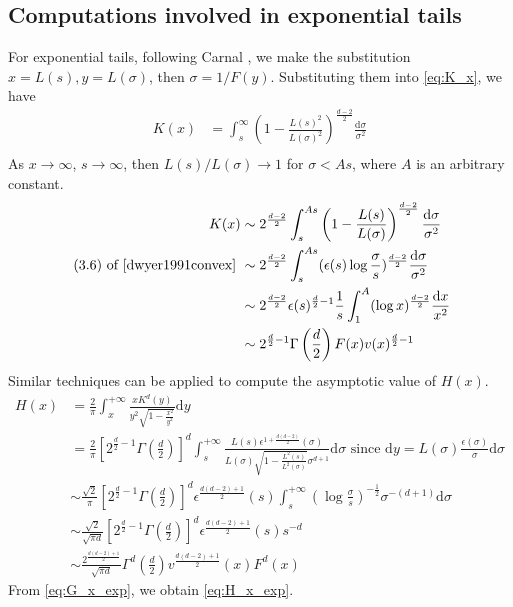 \documentclass{aptpub}
\def\d{\mathrm{d}}
\begin{document}
\subsection{Computations involved in exponential tails}
For exponential tails, following Carnal \cite{carnal1970konvexe},
we make
the substitution $x=L(s), y=L(\sigma)$, then $\sigma=1/F(y)$.
Substituting them into \eqref{eq:K_x}, we have
\begin{align*}
    K(x)  & = \int_s^{\infty} \left(1-\frac{L(s)^2}{L(\sigma)^2} \right)^{\frac{d-2}{2}} \frac{\d \sigma}{\sigma^2} \\
\end{align*}
As $x\to \infty$, $s\to \infty$,
then $L(s)/L(\sigma) \to 1$ for $\sigma <As$,
where $A$ is an arbitrary constant.
\begin{align*}
     K(x)& \sim 2^{\frac{d-2}{2}} 
     \int_s^{As} \left(1-\frac{L(s)}{L(\sigma)}\right)^{\frac{d-2}{2}}
     \frac{\d \sigma}{\sigma^2} \\
     \textrm{ (3.6) of \cite{dwyer1991convex} }& 
     \sim  2^{\frac{d-2}{2}}  \int_s^{As} (\epsilon(s) \log\frac{\sigma}{s})^{\frac{d-2}{2}}\frac{\d \sigma}{\sigma^2}\\
     &\sim 2^{\frac{d-2}{2}} \epsilon(s)^{\frac{d}{2}-1} \frac{1}{s} \int_1^{A} (\log x )^{\frac{d-2}{2}}\frac{\d x}{x^2}\\
     & \sim 2^{\frac{d}{2}-1} \Gamma\left(\frac{d}{2}\right)F(x) v(x)^{\frac{d}{2}-1}    
\end{align*}
Similar techniques can be applied to compute the asymptotic value of $H(x)$.
\begin{align*}
    H(x) & = \frac{2}{\pi} \int_x^{+\infty}\frac{x K^d(y)}{y^2 \sqrt{1-\frac{x^2}{y^2}}}\d y\\
    &=\frac{2}{\pi}\left[2^{\frac{d}{2}-1} \Gamma\left(\frac{d}{2}\right)\right]^d
    \int_s^{+\infty}\frac{L(s) \epsilon^{1+\frac{d(d-2)}{2}}(\sigma)}{L(\sigma) \sqrt{1-\frac{L^2(s)}{L^2(\sigma)}}\sigma^{d+1}} \d \sigma
    \textrm{ since } \d y=L(\sigma)\frac{\epsilon(\sigma)}{\sigma}\d \sigma \\
    &\sim  \frac{\sqrt{2}}{\pi}
    \left[2^{\frac{d}{2}-1} \Gamma\left(\frac{d}{2}\right)\right]^d
    \epsilon^{\frac{d(d-2)+1}{2}}(s)
    \int_s^{+\infty} \left(\log\frac{\sigma}{s}
    \right)^{-\frac{1}{2}}
    \sigma^{-(d+1)}\d \sigma \\
    &\sim \frac{\sqrt{2}}{\sqrt{\pi d}}\left[2^{\frac{d}{2}-1} \Gamma\left(\frac{d}{2}\right)\right]^d
    \epsilon^{\frac{d(d-2)+1}{2}}(s)s^{-d}\\
    &\sim \frac{2^{\frac{d(d-2)+1}{2}}}{\sqrt{\pi d}}\Gamma^d\left(\frac{d}{2}\right)
    v^{\frac{d(d-2)+1}{2}}(x)F^d(x)
\end{align*}
From \eqref{eq:G_x_exp}, we obtain \eqref{eq:H_x_exp}.
\end{document}
